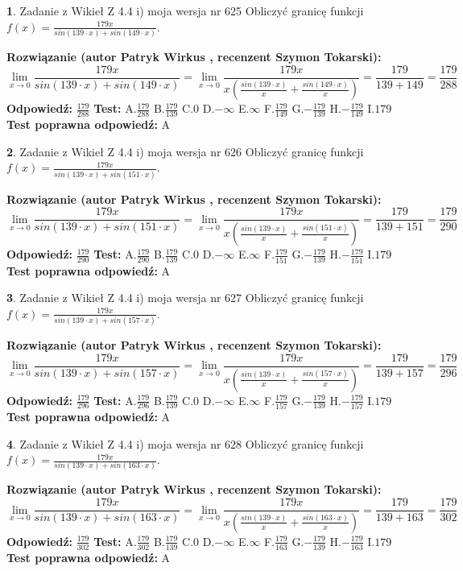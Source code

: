 \documentclass[12pt, a4paper]{article}
\theoremstyle{definition} %
\newtheorem{zad}{}
\newcommand{\zadStart}[1]{\begin{zad}#1\newline}
\newcommand{\zadStop}{\end{zad}}
\newcommand{\rozwStart}[2]{\noindent \textbf{Rozwiązanie (autor #1 , recenzent #2): }\newline}
\newcommand{\rozwStop}{\newline}
\newcommand{\odpStart}{\noindent \textbf{Odpowiedź:}\newline}
\newcommand{\odpStop}{\newline}
\newcommand{\testStart}{\noindent \textbf{Test:}\newline}
\newcommand{\testStop}{\newline}
\newcommand{\kluczStart}{\noindent \textbf{Test poprawna odpowiedź:}\newline}
\newcommand{\kluczStop}{\newline}
\begin{document}
\zadStart{Zadanie z Wikieł Z 4.4 i) moja wersja nr 625}
Obliczyć granicę funkcji $f(x)=\frac{179x}{sin(139\cdot x) +sin(149\cdot x)}$.
\zadStop
\rozwStart{Patryk Wirkus}{Szymon Tokarski}
$$\lim\limits_{x\to 0}\frac{179x}{sin(139\cdot x) +sin(149\cdot x)}=\lim\limits_{x\to 0}\frac{179x}{x(\frac{sin(139\cdot x)}{x}+\frac{sin(149\cdot x)}{x})}=\frac{179}{139+149} = \frac{179}{288}$$
\rozwStop
\odpStart
$\frac{179}{288}$
\odpStop
\testStart
A.$\frac{179}{288}$
B.$\frac{179}{139}$
C.$0$
D.$-\infty$
E.$\infty$
F.$\frac{179}{149}$
G.$-\frac{179}{139}$
H.$-\frac{179}{149}$
I.$179$
\testStop
\kluczStart
A
\kluczStop



\zadStart{Zadanie z Wikieł Z 4.4 i) moja wersja nr 626}
Obliczyć granicę funkcji $f(x)=\frac{179x}{sin(139\cdot x) +sin(151\cdot x)}$.
\zadStop
\rozwStart{Patryk Wirkus}{Szymon Tokarski}
$$\lim\limits_{x\to 0}\frac{179x}{sin(139\cdot x) +sin(151\cdot x)}=\lim\limits_{x\to 0}\frac{179x}{x(\frac{sin(139\cdot x)}{x}+\frac{sin(151\cdot x)}{x})}=\frac{179}{139+151} = \frac{179}{290}$$
\rozwStop
\odpStart
$\frac{179}{290}$
\odpStop
\testStart
A.$\frac{179}{290}$
B.$\frac{179}{139}$
C.$0$
D.$-\infty$
E.$\infty$
F.$\frac{179}{151}$
G.$-\frac{179}{139}$
H.$-\frac{179}{151}$
I.$179$
\testStop
\kluczStart
A
\kluczStop



\zadStart{Zadanie z Wikieł Z 4.4 i) moja wersja nr 627}
Obliczyć granicę funkcji $f(x)=\frac{179x}{sin(139\cdot x) +sin(157\cdot x)}$.
\zadStop
\rozwStart{Patryk Wirkus}{Szymon Tokarski}
$$\lim\limits_{x\to 0}\frac{179x}{sin(139\cdot x) +sin(157\cdot x)}=\lim\limits_{x\to 0}\frac{179x}{x(\frac{sin(139\cdot x)}{x}+\frac{sin(157\cdot x)}{x})}=\frac{179}{139+157} = \frac{179}{296}$$
\rozwStop
\odpStart
$\frac{179}{296}$
\odpStop
\testStart
A.$\frac{179}{296}$
B.$\frac{179}{139}$
C.$0$
D.$-\infty$
E.$\infty$
F.$\frac{179}{157}$
G.$-\frac{179}{139}$
H.$-\frac{179}{157}$
I.$179$
\testStop
\kluczStart
A
\kluczStop



\zadStart{Zadanie z Wikieł Z 4.4 i) moja wersja nr 628}
Obliczyć granicę funkcji $f(x)=\frac{179x}{sin(139\cdot x) +sin(163\cdot x)}$.
\zadStop
\rozwStart{Patryk Wirkus}{Szymon Tokarski}
$$\lim\limits_{x\to 0}\frac{179x}{sin(139\cdot x) +sin(163\cdot x)}=\lim\limits_{x\to 0}\frac{179x}{x(\frac{sin(139\cdot x)}{x}+\frac{sin(163\cdot x)}{x})}=\frac{179}{139+163} = \frac{179}{302}$$
\rozwStop
\odpStart
$\frac{179}{302}$
\odpStop
\testStart
A.$\frac{179}{302}$
B.$\frac{179}{139}$
C.$0$
D.$-\infty$
E.$\infty$
F.$\frac{179}{163}$
G.$-\frac{179}{139}$
H.$-\frac{179}{163}$
I.$179$
\testStop
\kluczStart
A
\kluczStop
\end{document}
